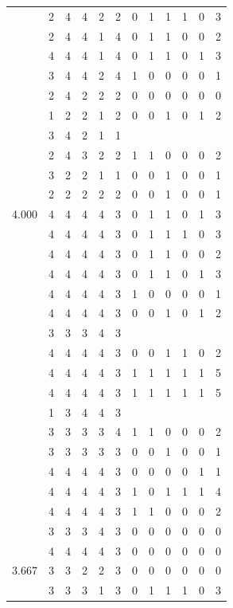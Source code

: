 \documentclass[]{book}
\theoremstyle{definition}
\theoremstyle{definition}
\theoremstyle{definition}
\theoremstyle{remark}
\begin{document}
\begin{table}
{\begin{tabular}[t]{rrrrrrrrrrrr}
 & 2 & 4 & 4 & 2 & 2 & 0 & 1 & 1 & 1 & 0 & 3\\
 & 2 & 4 & 4 & 1 & 4 & 0 & 1 & 1 & 0 & 0 & 2\\
 & 4 & 4 & 4 & 1 & 4 & 0 & 1 & 1 & 0 & 1 & 3\\
 & 3 & 4 & 4 & 2 & 4 & 1 & 0 & 0 & 0 & 0 & 1\\
 & 2 & 4 & 2 & 2 & 2 & 0 & 0 & 0 & 0 & 0 & 0\\
 & 1 & 2 & 2 & 1 & 2 & 0 & 0 & 1 & 0 & 1 & 2\\
 & 3 & 4 & 2 & 1 & 1 &  &  &  &  &  & \\
 & 2 & 4 & 3 & 2 & 2 & 1 & 1 & 0 & 0 & 0 & 2\\
 & 3 & 2 & 2 & 1 & 1 & 0 & 0 & 1 & 0 & 0 & 1\\
 & 2 & 2 & 2 & 2 & 2 & 0 & 0 & 1 & 0 & 0 & 1\\
4.000 & 4 & 4 & 4 & 4 & 3 & 0 & 1 & 1 & 0 & 1 & 3\\
 & 4 & 4 & 4 & 4 & 3 & 0 & 1 & 1 & 1 & 0 & 3\\
 & 4 & 4 & 4 & 4 & 3 & 0 & 1 & 1 & 0 & 0 & 2\\
 & 4 & 4 & 4 & 4 & 3 & 0 & 1 & 1 & 0 & 1 & 3\\
 & 4 & 4 & 4 & 4 & 3 & 1 & 0 & 0 & 0 & 0 & 1\\
 & 4 & 4 & 4 & 4 & 3 & 0 & 0 & 1 & 0 & 1 & 2\\
 & 3 & 3 & 3 & 4 & 3 &  &  &  &  &  & \\
 & 4 & 4 & 4 & 4 & 3 & 0 & 0 & 1 & 1 & 0 & 2\\
 & 4 & 4 & 4 & 4 & 3 & 1 & 1 & 1 & 1 & 1 & 5\\
 & 4 & 4 & 4 & 4 & 3 & 1 & 1 & 1 & 1 & 1 & 5\\
 & 1 & 3 & 4 & 4 & 3 &  &  &  &  &  & \\
 & 3 & 3 & 3 & 3 & 4 & 1 & 1 & 0 & 0 & 0 & 2\\
 & 3 & 3 & 3 & 3 & 3 & 0 & 0 & 1 & 0 & 0 & 1\\
 & 4 & 4 & 4 & 4 & 3 & 0 & 0 & 0 & 0 & 1 & 1\\
 & 4 & 4 & 4 & 4 & 3 & 1 & 0 & 1 & 1 & 1 & 4\\
 & 4 & 4 & 4 & 4 & 3 & 1 & 1 & 0 & 0 & 0 & 2\\
 & 3 & 3 & 3 & 4 & 3 & 0 & 0 & 0 & 0 & 0 & 0\\
 & 4 & 4 & 4 & 4 & 3 & 0 & 0 & 0 & 0 & 0 & 0\\
3.667 & 3 & 3 & 2 & 2 & 3 & 0 & 0 & 0 & 0 & 0 & 0\\
 & 3 & 3 & 3 & 1 & 3 & 0 & 1 & 1 & 1 & 0 & 3\\

\end{tabular}}
\end{table}
\end{document}

